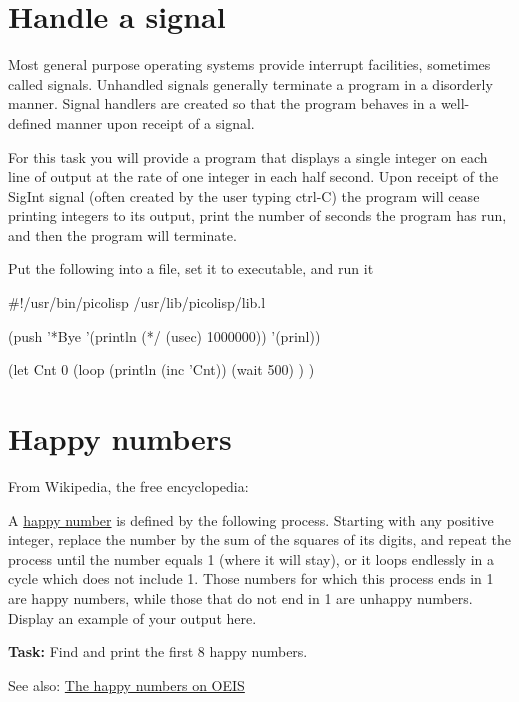 \pagebreak{}
\section*{Handle a signal}

Most general purpose operating systems provide interrupt facilities,
sometimes called signals. Unhandled signals generally terminate a
program in a disorderly manner. Signal handlers are created so that the
program behaves in a well-defined manner upon receipt of a signal.

For this task you will provide a program that displays a single integer
on each line of output at the rate of one integer in each half second.
Upon receipt of the SigInt signal (often created by the user typing
ctrl-C) the program will cease printing integers to its output, print
the number of seconds the program has run, and then the program will
terminate.

\begin{wideverbatim}

Put the following into a file, set it to executable, and run it

#!/usr/bin/picolisp /usr/lib/picolisp/lib.l

(push '*Bye '(println (*/ (usec) 1000000)) '(prinl))

(let Cnt 0
   (loop
      (println (inc 'Cnt))
      (wait 500) ) )

\end{wideverbatim}

\pagebreak{}
\section*{Happy numbers}

From Wikipedia, the free encyclopedia:

A \href{http://en.wikipedia.org/wiki/Happy\_number}{happy number} is
defined by the following process. Starting with any positive integer,
replace the number by the sum of the squares of its digits, and repeat
the process until the number equals 1 (where it will stay), or it loops
endlessly in a cycle which does not include 1. Those numbers for which
this process ends in 1 are happy numbers, while those that do not end in
1 are unhappy numbers. Display an example of your output here.

\textbf{Task:} Find and print the first 8 happy numbers.

See also: \href{http://oeis.org/A007770}{The happy numbers on OEIS}


